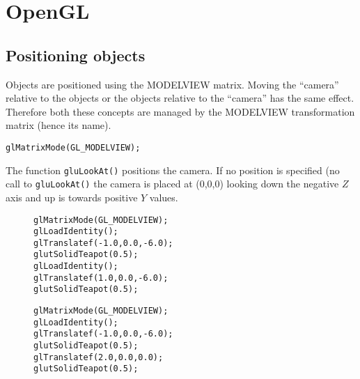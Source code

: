 \documentclass[12pt]{article}
\begin{document}
\maketitle




\section{OpenGL}

\subsection{Positioning objects} 
Objects are positioned using the MODELVIEW matrix. Moving the 
``camera'' relative to the objects or the objects relative to 
the ``camera'' has the same effect. Therefore both these concepts
are managed by the MODELVIEW transformation matrix (hence its name). 

\begin{small}
\begin{verbatim}
glMatrixMode(GL_MODELVIEW);
\end{verbatim}
\end{small}       

The function {\tt gluLookAt()} positions the camera. If no position 
is specified (no call to {\tt gluLookAt()} the camera is placed 
at (0,0,0) looking down the negative $Z$ axis and up is towards positive $Y$
values.                                   

\begin{figure}
\begin{small}
\begin{verbatim}
glMatrixMode(GL_MODELVIEW);
glLoadIdentity();
glTranslatef(-1.0,0.0,-6.0);
glutSolidTeapot(0.5);
glLoadIdentity();
glTranslatef(1.0,0.0,-6.0);
glutSolidTeapot(0.5);
\end{verbatim}
\end{small} 
\label{Place two teapots next to eachother, one way}                   
\end{figure}

\begin{figure}
\begin{small}
\begin{verbatim}
glMatrixMode(GL_MODELVIEW);
glLoadIdentity();
glTranslatef(-1.0,0.0,-6.0);
glutSolidTeapot(0.5);
glTranslatef(2.0,0.0,0.0);
glutSolidTeapot(0.5);
\end{verbatim}
\end{small} 
\label{Place two teapots next to eachother, another way. Second teapot 
       is placed relative to the first one}                   
\end{figure}
\end{document}
